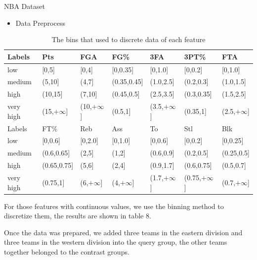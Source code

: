 \documentclass[
 size=14pt,
 paper=smartboard,  %
 mode=present, 		%
 display=slides, 	%
 style=tuliplab,  	%
 pauseslide,
 fleqn,leqno]{powerdot}
\begin{document}
\begin{slide}[toc=,bm=]{NBA Dataset}
\begin{itemize}
\item Data Preprocess
\end{itemize}

\begin{table}
\setlength{\abovecaptionskip}{0pt}
\setlength{\belowcaptionskip}{10pt}
\centering
\caption{The bins that used to discrete data of each feature}

\begin{tabular}{p{2.5cm}p{2cm}p{1.8cm}p{2cm}p{1.8cm}p{1.8cm}p{1.8cm}}
\hline
  Labels & Pts & FGA & FG\% & 3FA & 3PT\% & FTA  \\
\hline
  low &  [0,5]& [0,4] & [0,0.35] & [0,1.0] & [0,0.2] & [0,1.0] \\
  medium& (5,10]& (4,7] & (0.35,0.45] & (1.0,2.5]& (0.2,0.3] & (1.0,1.5] \\
  high &  (10,15] & (7,10] & (0.45,0.5] & (2.5,3.5]& (0.3,0.35]& (1.5,2.5] \\
  very high&(15,$+\infty$]& (10,$+\infty$] & (0.5,1] & (3.5,$+\infty$] & (0.35,1] & (2.5,$+\infty$] \\
\hline
 Labels & FT\% & Reb & Ass & To & Stl & Blk \\
\hline
  low   & [0,0.6] & [0,2.0] & [0,1.0] & [0,0.6] & [0,0.2] & [0,0.25] \\
  medium& (0.6,0.65]& (2,5] & (1,2] & (0.6,0.9] & (0.2,0.5] & (0.25,0.5] \\
  high  & (0.65,0.75] & (5,6] & (2,4] & (0.9,1.7] & (0.6,0.75] & (0.5,0.7] \\
  very high& (0.75,1] & (6,$+\infty$] & (4,$+\infty$] & (1.7,$+\infty$] & (0.75,$+\infty$] & (0.7,$+\infty$]\\
\hline
\end{tabular}
\end{table}

\begin{note}
For those features with continuous values,
we use the binning method to discretize them,
the results are shown in table $8$.

Once the data was prepared,
we added three teams in the eastern division
and three teams in the western division into the query group,
the other teams together belonged to the contrast groups.
\end{note}

\end{slide}
\end{document}
